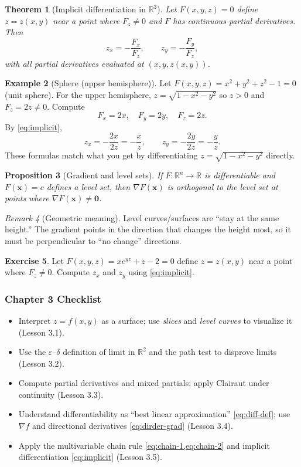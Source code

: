 \documentclass[12pt]{article}
\numberwithin{equation}{section}
\newcommand{\RR}{\mathbb{R}}
\newcommand{\vect}[1]{\boldsymbol{#1}}   %
\theoremstyle{plain}
\newtheorem{theorem}{Theorem}[section]
\newtheorem{proposition}[theorem]{Proposition}
\theoremstyle{definition}
\newtheorem{example}[theorem]{Example}
\newtheorem{exercise}[theorem]{Exercise}
\theoremstyle{remark}
\newtheorem{remark}[theorem]{Remark}
\begin{document}
\begin{theorem}[Implicit differentiation in $\RR^3$]\label{thm:implicit}
Let $F(x,y,z)=0$ define $z=z(x,y)$ near a point where $F_z\neq 0$ and $F$ has continuous partial derivatives. Then
\begin{equation}\label{eq:implicit}
z_x=-\frac{F_x}{F_z},\qquad z_y=-\frac{F_y}{F_z},
\end{equation}
with all partial derivatives evaluated at $(x,y,z(x,y))$.
\end{theorem}

\begin{example}[Sphere (upper hemisphere)]
Let $F(x,y,z)=x^2+y^2+z^2-1=0$ (unit sphere). For the upper hemisphere, $z=\sqrt{1-x^2-y^2}$ so $z>0$ and $F_z=2z\neq 0$.
Compute
\[
F_x=2x,\quad F_y=2y,\quad F_z=2z.
\]
By \cref{eq:implicit},
\[
z_x=-\frac{2x}{2z}=-\frac{x}{z},\qquad
z_y=-\frac{2y}{2z}=-\frac{y}{z}.
\]
These formulas match what you get by differentiating $z=\sqrt{1-x^2-y^2}$ directly.
\end{example}

\begin{proposition}[Gradient and level sets]\label{prop:grad-level}
If $F:\RR^n\to\RR$ is differentiable and $F(\vect x)=c$ defines a level set, then $\nabla F(\vect x)$ is orthogonal to the level set at points where $\nabla F(\vect x)\neq \vect 0$.
\end{proposition}

\begin{remark}[Geometric meaning]
Level curves/surfaces are “stay at the same height.” The gradient points in the direction that changes the height most, so it must be perpendicular to “no change” directions.
\end{remark}

\begin{exercise}
Let $F(x,y,z)=x e^{yz}+z-2=0$ define $z=z(x,y)$ near a point where $F_z\neq 0$.
Compute $z_x$ and $z_y$ using \cref{eq:implicit}.
\end{exercise}

\subsubsection*{Chapter 3 Checklist}
\begin{itemize}
\item Interpret $z=f(x,y)$ as a surface; use \emph{slices} and \emph{level curves} to visualize it (Lesson 3.1).
\item Use the $\varepsilon$--$\delta$ definition of limit in $\RR^2$ and the path test to disprove limits (Lesson 3.2).
\item Compute partial derivatives and mixed partials; apply Clairaut under continuity (Lesson 3.3).
\item Understand differentiability as “best linear approximation” \cref{eq:diff-def}; use $\nabla f$ and directional derivatives \cref{eq:dirder-grad} (Lesson 3.4).
\item Apply the multivariable chain rule \cref{eq:chain-1,eq:chain-2} and implicit differentiation \cref{eq:implicit} (Lesson 3.5).
\end{itemize}
\end{document}

